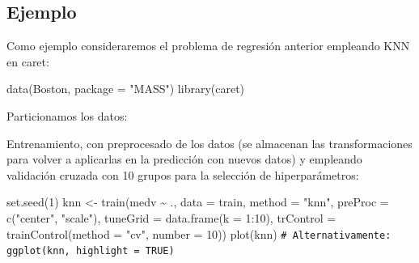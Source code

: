 \documentclass[
]{book}
\newenvironment{Shaded}{\begin{snugshade}}{\end{snugshade}}
\newcommand{\AttributeTok}[1]{\textcolor[rgb]{0.77,0.63,0.00}{#1}}
\newcommand{\CommentTok}[1]{\textcolor[rgb]{0.56,0.35,0.01}{\textit{#1}}}
\newcommand{\ConstantTok}[1]{\textcolor[rgb]{0.00,0.00,0.00}{#1}}
\newcommand{\DecValTok}[1]{\textcolor[rgb]{0.00,0.00,0.81}{#1}}
\newcommand{\FloatTok}[1]{\textcolor[rgb]{0.00,0.00,0.81}{#1}}
\newcommand{\FunctionTok}[1]{\textcolor[rgb]{0.00,0.00,0.00}{#1}}
\newcommand{\NormalTok}[1]{#1}
\newcommand{\OtherTok}[1]{\textcolor[rgb]{0.56,0.35,0.01}{#1}}
\newcommand{\SpecialCharTok}[1]{\textcolor[rgb]{0.00,0.00,0.00}{#1}}
\newcommand{\StringTok}[1]{\textcolor[rgb]{0.31,0.60,0.02}{#1}}
\theoremstyle{break}
\theoremstyle{nonumberplain}
\renewcommand{\CommentTok}[1]{\textcolor[rgb]{0.41,0.41,0.41}{\texttt{#1}}}
\begin{document}
\hypertarget{ejemplo}{%
\subsection{Ejemplo}\label{ejemplo}}

Como ejemplo consideraremos el problema de regresión anterior empleando KNN en caret:

\begin{Shaded}
\begin{Highlighting}[]
\FunctionTok{data}\NormalTok{(Boston, }\AttributeTok{package =} \StringTok{"MASS"}\NormalTok{)}
\FunctionTok{library}\NormalTok{(caret)}
\end{Highlighting}
\end{Shaded}

Particionamos los datos:

\begin{Shaded}
\end{Shaded}

Entrenamiento, con preprocesado de los datos (se almacenan las transformaciones para volver a aplicarlas en la predicción con nuevos datos) y empleando validación cruzada con 10 grupos para la selección de hiperparámetros:

\begin{Shaded}
\begin{Highlighting}[]
\FunctionTok{set.seed}\NormalTok{(}\DecValTok{1}\NormalTok{)}
\NormalTok{knn }\OtherTok{\textless{}{-}} \FunctionTok{train}\NormalTok{(medv }\SpecialCharTok{\textasciitilde{}}\NormalTok{ ., }\AttributeTok{data =}\NormalTok{ train,}
             \AttributeTok{method =} \StringTok{"knn"}\NormalTok{,}
             \AttributeTok{preProc =} \FunctionTok{c}\NormalTok{(}\StringTok{"center"}\NormalTok{, }\StringTok{"scale"}\NormalTok{),}
             \AttributeTok{tuneGrid =} \FunctionTok{data.frame}\NormalTok{(}\AttributeTok{k =} \DecValTok{1}\SpecialCharTok{:}\DecValTok{10}\NormalTok{),}
             \AttributeTok{trControl =} \FunctionTok{trainControl}\NormalTok{(}\AttributeTok{method =} \StringTok{"cv"}\NormalTok{, }\AttributeTok{number =} \DecValTok{10}\NormalTok{))}
\FunctionTok{plot}\NormalTok{(knn) }\CommentTok{\# Alternativamente: ggplot(knn, highlight = TRUE)}
\end{Highlighting}
\end{Shaded}
\end{document}
